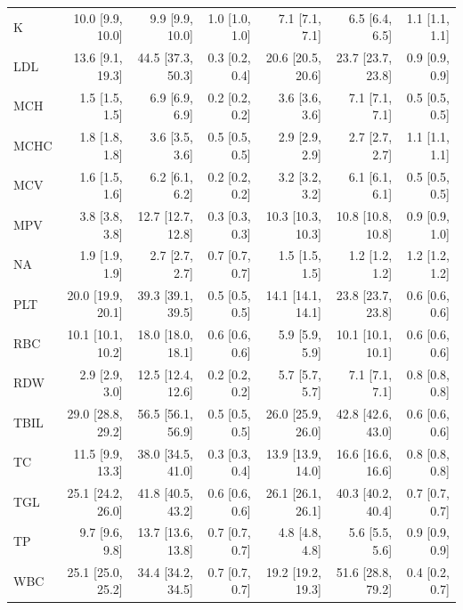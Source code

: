 \begin{table}[ht]
\begin{tabular}{lrrrrrr}
K & 10.0 [9.9, 10.0] & 9.9 [9.9, 10.0] & 1.0 [1.0, 1.0] & 7.1 [7.1, 7.1] & 6.5 [6.4, 6.5] & 1.1 [1.1, 1.1] \\
LDL & 13.6 [9.1, 19.3] & 44.5 [37.3, 50.3] & 0.3 [0.2, 0.4] & 20.6 [20.5, 20.6] & 23.7 [23.7, 23.8] & 0.9 [0.9, 0.9] \\
MCH & 1.5 [1.5, 1.5] & 6.9 [6.9, 6.9] & 0.2 [0.2, 0.2] & 3.6 [3.6, 3.6] & 7.1 [7.1, 7.1] & 0.5 [0.5, 0.5] \\
MCHC & 1.8 [1.8, 1.8] & 3.6 [3.5, 3.6] & 0.5 [0.5, 0.5] & 2.9 [2.9, 2.9] & 2.7 [2.7, 2.7] & 1.1 [1.1, 1.1] \\
MCV & 1.6 [1.5, 1.6] & 6.2 [6.1, 6.2] & 0.2 [0.2, 0.2] & 3.2 [3.2, 3.2] & 6.1 [6.1, 6.1] & 0.5 [0.5, 0.5] \\
MPV & 3.8 [3.8, 3.8] & 12.7 [12.7, 12.8] & 0.3 [0.3, 0.3] & 10.3 [10.3, 10.3] & 10.8 [10.8, 10.8] & 0.9 [0.9, 1.0] \\
NA & 1.9 [1.9, 1.9] & 2.7 [2.7, 2.7] & 0.7 [0.7, 0.7] & 1.5 [1.5, 1.5] & 1.2 [1.2, 1.2] & 1.2 [1.2, 1.2] \\
PLT & 20.0 [19.9, 20.1] & 39.3 [39.1, 39.5] & 0.5 [0.5, 0.5] & 14.1 [14.1, 14.1] & 23.8 [23.7, 23.8] & 0.6 [0.6, 0.6] \\
RBC & 10.1 [10.1, 10.2] & 18.0 [18.0, 18.1] & 0.6 [0.6, 0.6] & 5.9 [5.9, 5.9] & 10.1 [10.1, 10.1] & 0.6 [0.6, 0.6] \\
RDW & 2.9 [2.9, 3.0] & 12.5 [12.4, 12.6] & 0.2 [0.2, 0.2] & 5.7 [5.7, 5.7] & 7.1 [7.1, 7.1] & 0.8 [0.8, 0.8] \\
TBIL & 29.0 [28.8, 29.2] & 56.5 [56.1, 56.9] & 0.5 [0.5, 0.5] & 26.0 [25.9, 26.0] & 42.8 [42.6, 43.0] & 0.6 [0.6, 0.6] \\
TC & 11.5 [9.9, 13.3] & 38.0 [34.5, 41.0] & 0.3 [0.3, 0.4] & 13.9 [13.9, 14.0] & 16.6 [16.6, 16.6] & 0.8 [0.8, 0.8] \\
TGL & 25.1 [24.2, 26.0] & 41.8 [40.5, 43.2] & 0.6 [0.6, 0.6] & 26.1 [26.1, 26.1] & 40.3 [40.2, 40.4] & 0.7 [0.7, 0.7] \\
TP & 9.7 [9.6, 9.8] & 13.7 [13.6, 13.8] & 0.7 [0.7, 0.7] & 4.8 [4.8, 4.8] & 5.6 [5.5, 5.6] & 0.9 [0.9, 0.9] \\
WBC & 25.1 [25.0, 25.2] & 34.4 [34.2, 34.5] & 0.7 [0.7, 0.7] & 19.2 [19.2, 19.3] & 51.6 [28.8, 79.2] & 0.4 [0.2, 0.7] \\
\bottomrule
\end{tabular}
\label{tab:variability}
\end{table}